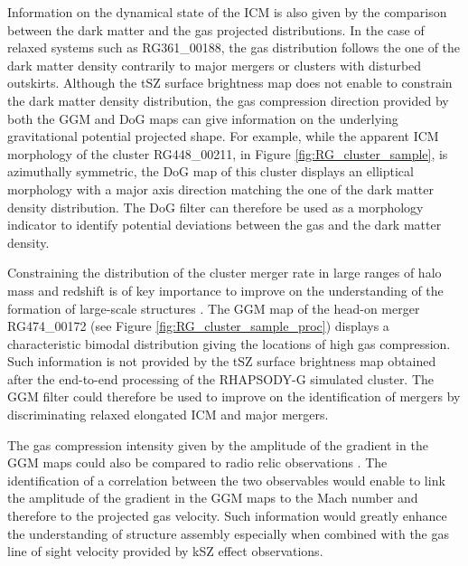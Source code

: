 \documentclass[twocolumn,traditabstract]{aa}
\begin{document}
Information on the dynamical state of the ICM is also given by the comparison between the dark matter and the gas projected distributions. In the case of relaxed systems such as RG361\_00188, the gas distribution follows the one of the dark matter density contrarily to major mergers or clusters with disturbed outskirts. Although the tSZ surface brightness map does not enable to constrain the dark matter density distribution, the gas compression direction provided by both the GGM and DoG maps can give information on the underlying gravitational potential projected shape. For example, while the apparent ICM morphology of the cluster RG448\_00211, in Figure \ref{fig:RG_cluster_sample}, is azimuthally symmetric, the DoG map of this cluster displays an elliptical morphology with a major axis direction matching the one of the dark matter density distribution. The DoG filter can therefore be used as a morphology indicator to identify potential deviations between the gas and the dark matter density.

Constraining the distribution of the cluster merger rate in large ranges of halo mass and redshift is of key importance to improve on the understanding of the formation of large-scale structures \citep[e.g.][]{Cassano2016}. The GGM map of the head-on merger RG474\_00172 (see Figure \ref{fig:RG_cluster_sample_proc}) displays a characteristic bimodal distribution giving the locations of high gas compression. Such information is not provided by the tSZ surface brightness map obtained after the end-to-end processing of the RHAPSODY-G simulated cluster. The GGM filter could therefore be used to improve on the identification of mergers by discriminating relaxed elongated ICM and major mergers. 

The gas compression intensity given by the amplitude of the gradient in the GGM maps could also be compared to radio relic observations \citep[e.g.][]{vanWeeren2010}. The identification of a correlation between the two observables would enable to link the amplitude of the gradient in the GGM maps to the Mach number and therefore to the projected gas velocity. Such information would greatly enhance the understanding of structure assembly especially when combined with the gas line of sight velocity provided by kSZ effect observations.

\end{document}

